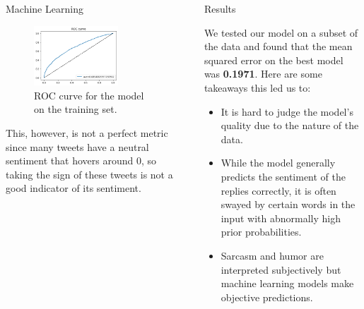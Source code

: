 \documentclass[final]{beamer}
\newlength{\sepwidth}
\newlength{\colwidth}
\newcommand{\separatorcolumn}{\begin{column}{\sepwidth}\end{column}}
\begin{document}
\begin{frame}[t]
\begin{columns}[t]
\begin{column}{\colwidth}
\begin{block}{Machine Learning}
    \begin{figure}[h]
      \centering
      \includegraphics[width=0.75\textwidth]{auroc.png}
      \caption{ROC curve for the model on the training set.}
    \end{figure}

    This, however, is not a perfect metric since many tweets have a neutral sentiment that hovers around 0, so taking the sign of these tweets is not a good indicator of its sentiment.

  \end{block}

\end{column}

\separatorcolumn

\begin{column}{\colwidth}

  \begin{alertblock}{Results}

    We tested our model on a subset of the data and found that the mean squared error on the best model was \textbf{0.1971}. Here are some takeaways this led us to:

    \begin{itemize}
      \item It is hard to judge the model's quality due to the nature of the data.
      \item While the model generally predicts the sentiment of the replies correctly, it is often swayed by certain words in the input with abnormally high prior probabilities.
      \item Sarcasm and humor are interpreted subjectively but machine learning models make objective predictions.
    \end{itemize}

  \end{alertblock}


\end{column}
\end{columns}
\end{frame}
\end{document}
